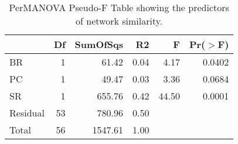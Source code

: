 \begin{table}[ht]
\centering
\begin{tabular}{lrrrrr}
  \hline
 & Df & SumOfSqs & R2 & F & Pr($>$F) \\ 
  \hline
BR & 1 & 61.42 & 0.04 & 4.17 & 0.0402 \\ 
  PC & 1 & 49.47 & 0.03 & 3.36 & 0.0684 \\ 
  SR & 1 & 655.76 & 0.42 & 44.50 & 0.0001 \\ 
  Residual & 53 & 780.96 & 0.50 &  &  \\ 
  Total & 56 & 1547.61 & 1.00 &  &  \\ 
   \hline
\end{tabular}
\caption{PerMANOVA Pseudo-F Table showing the predictors of network similarity.} 
\label{tab:cn_perm_ng}
\end{table}

